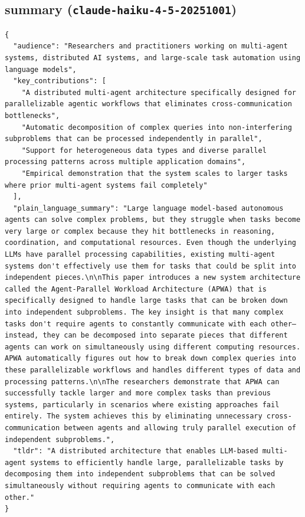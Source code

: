 \documentclass[11pt]{article}
\begin{document}
\subsection*{summary (\texttt{claude-haiku-4-5-20251001})}
\begin{verbatim}
{
  "audience": "Researchers and practitioners working on multi-agent systems, distributed AI systems, and large-scale task automation using language models",
  "key_contributions": [
    "A distributed multi-agent architecture specifically designed for parallelizable agentic workflows that eliminates cross-communication bottlenecks",
    "Automatic decomposition of complex queries into non-interfering subproblems that can be processed independently in parallel",
    "Support for heterogeneous data types and diverse parallel processing patterns across multiple application domains",
    "Empirical demonstration that the system scales to larger tasks where prior multi-agent systems fail completely"
  ],
  "plain_language_summary": "Large language model-based autonomous agents can solve complex problems, but they struggle when tasks become very large or complex because they hit bottlenecks in reasoning, coordination, and computational resources. Even though the underlying LLMs have parallel processing capabilities, existing multi-agent systems don't effectively use them for tasks that could be split into independent pieces.\n\nThis paper introduces a new system architecture called the Agent-Parallel Workload Architecture (APWA) that is specifically designed to handle large tasks that can be broken down into independent subproblems. The key insight is that many complex tasks don't require agents to constantly communicate with each other—instead, they can be decomposed into separate pieces that different agents can work on simultaneously using different computing resources. APWA automatically figures out how to break down complex queries into these parallelizable workflows and handles different types of data and processing patterns.\n\nThe researchers demonstrate that APWA can successfully tackle larger and more complex tasks than previous systems, particularly in scenarios where existing approaches fail entirely. The system achieves this by eliminating unnecessary cross-communication between agents and allowing truly parallel execution of independent subproblems.",
  "tldr": "A distributed architecture that enables LLM-based multi-agent systems to efficiently handle large, parallelizable tasks by decomposing them into independent subproblems that can be solved simultaneously without requiring agents to communicate with each other."
}
\end{verbatim}
\end{document}
